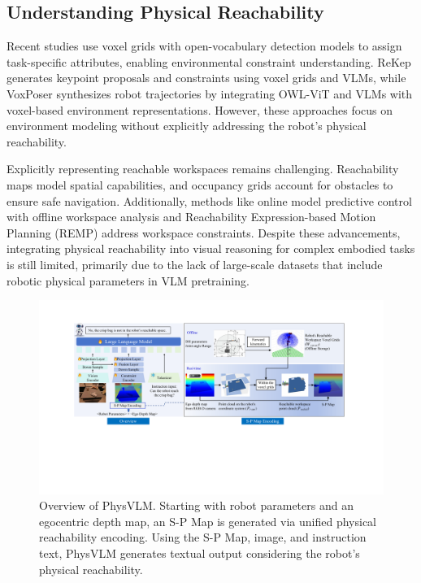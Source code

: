 \documentclass[10pt,twocolumn,letterpaper]{article}
\begin{document}
\subsection{Understanding Physical Reachability}

Recent studies use voxel grids with open-vocabulary detection models to assign task-specific attributes, enabling environmental constraint understanding. ReKep \cite{rekep} generates keypoint proposals and constraints using voxel grids and VLMs, while VoxPoser \cite{voxposer} synthesizes robot trajectories by integrating OWL-ViT \cite{owlvit} and VLMs with voxel-based environment representations. However, these approaches focus on environment modeling without explicitly addressing the robot’s physical reachability.

Explicitly representing reachable workspaces remains challenging. Reachability maps \cite{workspace_structure} model spatial capabilities, and occupancy grids \cite{whole_body_reach} account for obstacles to ensure safe navigation. Additionally, methods like online model predictive control with offline workspace analysis \cite{ws1} and Reachability Expression-based Motion Planning (REMP) \cite{ws2} address workspace constraints. Despite these advancements, integrating physical reachability into visual reasoning for complex embodied tasks is still limited, primarily due to the lack of large-scale datasets that include robotic physical parameters in VLM pretraining.

\begin{figure}[ht]
\vskip 0.2in
\begin{center}
\centerline{\includegraphics[width=1\linewidth]{images/image2.pdf}}
\caption{Overview of PhysVLM. Starting with robot parameters and an egocentric depth map, an S-P Map is generated via unified physical reachability encoding. Using the S-P Map, image, and instruction text, PhysVLM generates textual output considering the robot's physical reachability.}
\label{image2}
\end{center}
\vskip -0.2in
\end{figure}
\end{document}
